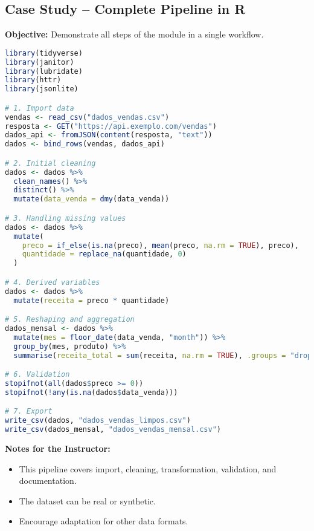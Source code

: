 \subsection{\textcolor{subsectionblue}{Case Study – Complete Pipeline in R}}
\textbf{Objective:} Demonstrate all steps of the module in a single workflow.

\begin{lstlisting}[language=R]
library(tidyverse)
library(janitor)
library(lubridate)
library(httr)
library(jsonlite)

# 1. Import data
vendas <- read_csv("dados_vendas.csv")
resposta <- GET("https://api.exemplo.com/vendas")
dados_api <- fromJSON(content(resposta, "text"))
dados <- bind_rows(vendas, dados_api)

# 2. Initial cleaning
dados <- dados %>%
  clean_names() %>%
  distinct() %>%
  mutate(data_venda = dmy(data_venda))

# 3. Handling missing values
dados <- dados %>%
  mutate(
    preco = if_else(is.na(preco), mean(preco, na.rm = TRUE), preco),
    quantidade = replace_na(quantidade, 0)
  )

# 4. Derived variables
dados <- dados %>%
  mutate(receita = preco * quantidade)

# 5. Reshaping and aggregation
dados_mensal <- dados %>%
  mutate(mes = floor_date(data_venda, "month")) %>%
  group_by(mes, produto) %>%
  summarise(receita_total = sum(receita, na.rm = TRUE), .groups = "drop")

# 6. Validation
stopifnot(all(dados$preco >= 0))
stopifnot(!any(is.na(dados$data_venda)))

# 7. Export
write_csv(dados, "dados_vendas_limpos.csv")
write_csv(dados_mensal, "dados_vendas_mensal.csv")
\end{lstlisting}

\textbf{Notes for the Instructor:}
\begin{itemize}
  \item This pipeline covers import, cleaning, transformation, validation, and documentation.
  \item The dataset can be real or synthetic.
  \item Encourage adaptation for other data formats.
\end{itemize}